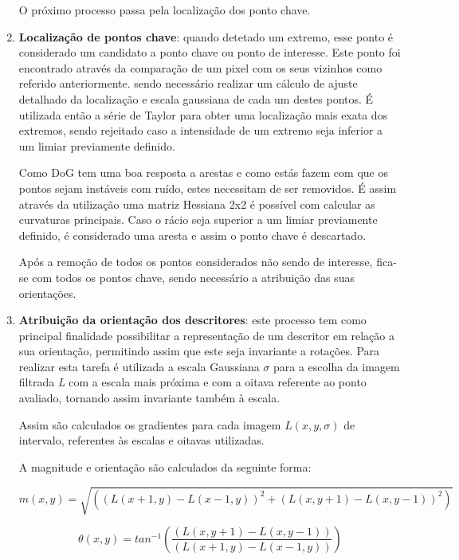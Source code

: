 \begin{enumerate}
O próximo processo passa pela localização dos ponto chave.

\item \textbf{Localização de pontos chave}: quando detetado um extremo, esse ponto é considerado um candidato a ponto chave ou ponto de interesse. Este ponto foi encontrado através da comparação de um pixel com os seus vizinhos como referido anteriormente. sendo necessário realizar um cálculo de ajuste detalhado da localização e escala gaussiana de cada um destes pontos. É utilizada então a série de Taylor para obter uma localização mais exata dos extremos, sendo rejeitado caso a intensidade de um extremo seja inferior a um limiar previamente definido. 

Como DoG tem uma boa resposta a arestas e como estás fazem com que os pontos sejam instáveis com ruído, estes necessitam de ser removidos. É assim através da utilização uma matriz Hessiana 2x2 é possível com calcular as curvaturas principais. Caso o rácio seja superior a um limiar previamente definido, é considerado uma aresta e assim o ponto chave é descartado.

Após a remoção de todos os pontos considerados não sendo de interesse, fica-se com todos os pontos chave, sendo necessário a atribuição das suas orientações. 

\item \textbf{Atribuição da orientação dos descritores}: este processo tem como principal finalidade possibilitar a representação de um descritor em relação a sua orientação, permitindo assim que este seja invariante a rotações. Para realizar esta tarefa é utilizada a escala Gaussiana $ \sigma $ para a escolha da imagem filtrada \textit{L} com a escala mais próxima e com a oitava referente ao ponto avaliado, tornando assim invariante também à escala.

Assim são calculados os gradientes para cada imagem $ L(x, y, \sigma) $ de intervalo, referentes às escalas e oitavas utilizadas.

A magnitude e orientação são calculados da seguinte forma:

\begin{equation}
m(x,y) = \sqrt{\left ( \left ( L(x+1, y) - L(x-1, y) \right )^2 + \left ( L(x, y+1) - L(x, y-1) \right )^2  \right )}
\end{equation}

\begin{equation}
\theta (x, y) = tan^{-1}\left ( \frac{\left ( L(x, y+1) - L(x, y-1) \right )}{\left ( L(x+1, y) - L(x-1, y) \right )} \right )
\end{equation}


\end{enumerate}
